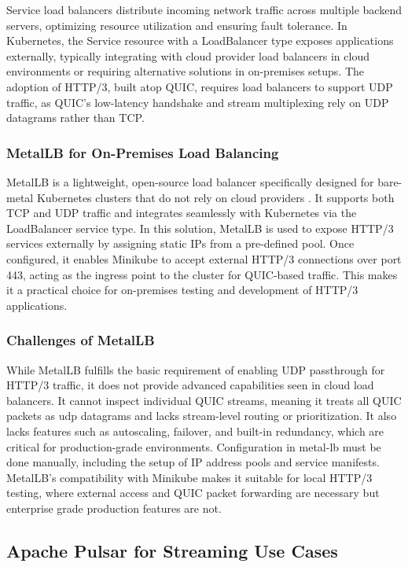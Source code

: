 Service load balancers distribute incoming network traffic across multiple backend servers, optimizing resource utilization and ensuring fault tolerance. In Kubernetes, the Service resource with a LoadBalancer type exposes applications externally, typically integrating with cloud provider load balancers in cloud environments or requiring alternative solutions in on-premises setups. The adoption of HTTP/3, built atop QUIC, requires load balancers to support UDP traffic, as QUIC's low-latency handshake and stream multiplexing rely on UDP datagrams rather than TCP.


\subsubsection{MetalLB for On-Premises Load Balancing}
MetalLB is a lightweight, open-source load balancer specifically designed for bare-metal Kubernetes clusters that do not rely on cloud providers \cite{metallb-docs}. It supports both TCP and UDP traffic and integrates seamlessly with Kubernetes via the LoadBalancer service type. In this solution, MetalLB is used to expose HTTP/3 services externally by assigning static IPs from a pre-defined pool. Once configured, it enables Minikube to accept external HTTP/3 connections over port 443, acting as the ingress point to the cluster for QUIC-based traffic. This makes it a practical choice for on-premises testing and development of HTTP/3 applications.

\subsubsection{Challenges of MetalLB}
While MetalLB fulfills the basic requirement of enabling UDP passthrough for HTTP/3 traffic, it does not provide advanced capabilities seen in cloud load balancers. It cannot inspect individual QUIC streams, meaning it treats all QUIC packets as udp datagrams and lacks stream-level routing or prioritization. It also lacks features such as autoscaling, failover, and built-in redundancy, which are critical for production-grade environments. Configuration in metal-lb must be done manually, including the setup of IP address pools and service manifests. MetalLB's compatibility with Minikube makes it suitable for local HTTP/3 testing, where external access and QUIC packet forwarding are necessary but enterprise grade production features are not.

\subsection{Apache Pulsar for Streaming Use Cases}
